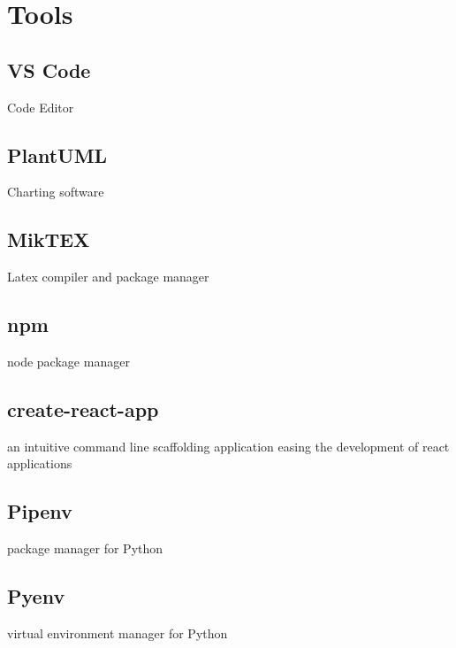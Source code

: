 \section{Tools}
\subsection{VS Code}
Code Editor
\subsection{PlantUML}
Charting software
\subsection{MikTEX}
Latex compiler and package manager
\subsection{npm}
node package manager
\subsection{create-react-app}
an intuitive command line scaffolding application easing the development of react applications
\subsection{Pipenv}
package manager for Python
\subsection{Pyenv}
virtual environment manager for Python
